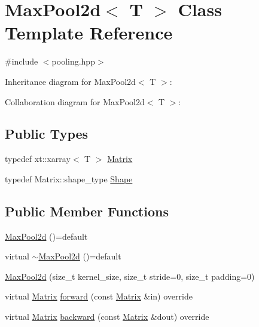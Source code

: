 \hypertarget{class_max_pool2d}{}\section{Max\+Pool2d$<$ T $>$ Class Template Reference}
\label{class_max_pool2d}


{\ttfamily \#include $<$pooling.\+hpp$>$}



Inheritance diagram for Max\+Pool2d$<$ T $>$\+:


Collaboration diagram for Max\+Pool2d$<$ T $>$\+:
\subsection*{Public Types}
\begin{DoxyCompactItemize}
\item 
typedef xt\+::xarray$<$ T $>$ \mbox{\hyperlink{class_max_pool2d_a8e701daf0dfb0e61e36eec865297a4e9}{Matrix}}
\item 
typedef Matrix\+::shape\+\_\+type \mbox{\hyperlink{class_max_pool2d_ad70f776b32f3a19af78573b634d00072}{Shape}}
\end{DoxyCompactItemize}
\subsection*{Public Member Functions}
\begin{DoxyCompactItemize}
\item 
\mbox{\hyperlink{class_max_pool2d_adf1b59faff18335a4d8b7cdc9d9acad6}{Max\+Pool2d}} ()=default
\item 
virtual \mbox{\hyperlink{class_max_pool2d_a826785eceda78b54d150404ef24d23c3}{$\sim$\+Max\+Pool2d}} ()=default
\item 
\mbox{\hyperlink{class_max_pool2d_a5cfd5c6ae11f49fffb3d4a68f261f013}{Max\+Pool2d}} (size\+\_\+t kernel\+\_\+size, size\+\_\+t stride=0, size\+\_\+t padding=0)
\item 
virtual \mbox{\hyperlink{class_layer_a22b1e7286096aa62bd245536c8ebdaf1}{Matrix}} \mbox{\hyperlink{class_max_pool2d_a424de7878c64a058a8549362dae448f0}{forward}} (const \mbox{\hyperlink{class_layer_a22b1e7286096aa62bd245536c8ebdaf1}{Matrix}} \&in) override
\item 
virtual \mbox{\hyperlink{class_layer_a22b1e7286096aa62bd245536c8ebdaf1}{Matrix}} \mbox{\hyperlink{class_max_pool2d_a05cc96411753ff4c0c79a1543af9e795}{backward}} (const \mbox{\hyperlink{class_layer_a22b1e7286096aa62bd245536c8ebdaf1}{Matrix}} \&dout) override
\end{DoxyCompactItemize}
